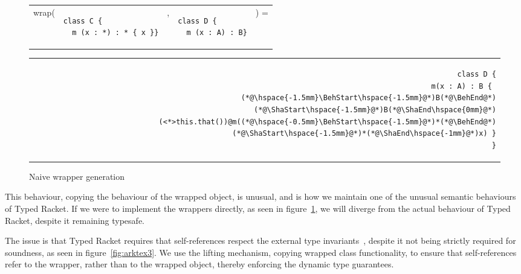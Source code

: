 \documentclass[a4paper,USenglish]{tex/lipics-v2016}
\begin{document}
\begin{figure}[!ht]
\begin{tabular}{ER{4.5cm}ER{3.5cm}E}
wrap( & 
\begin{lstlisting}
class C { 
  m (x : *) : * { x }}
\end{lstlisting}& , &
\begin{lstlisting}
class D { 
  m (x : A) : B}
\end{lstlisting}&) =
\end{tabular}
\begin{tabular}{@{}l@{}r@{}}
\hspace{4cm} \,&
\begin{minipage}{\textwidth-4cm}
\begin{lstlisting}
class D {
  m(x : A) : B { 
    (*@\hspace{-1.5mm}\BehStart\hspace{-1.5mm}@*)B(*@\BehEnd@*)(*@\ShaStart\hspace{-1.5mm}@*)B(*@\ShaEnd\hspace{0mm}@*)(<*>this.that())@m((*@\hspace{-0.5mm}\BehStart\hspace{-1.5mm}@*)*(*@\BehEnd@*)(*@\ShaStart\hspace{-1.5mm}@*)*(*@\ShaEnd\hspace{-1mm}@*)x) }
}
\end{lstlisting}
\end{minipage}
\end{tabular}
\caption{Naive wrapper generation}
\label{fig:rktex2}
\end{figure}

This behaviour, copying the behaviour of the wrapped object, is unusual, and is
how we maintain one of the unusual semantic behaviours of Typed Racket. If we 
were to implement the wrappers directly, as seen in figure~\ref{fig:rktex2}, 
we will diverge from the actual behaviour of Typed Racket, despite it remaining
typesafe.

The issue is that Typed Racket requires that self-references respect the external
type invariants~\cite{Takikawa:2012}, despite it not being strictly required for
soundness, as seen in figure~\ref{fig:arktex3}. We use the lifting mechanism,
copying wrapped class functionality, to ensure that self-references refer to the
wrapper, rather than to the wrapped object, thereby enforcing the dynamic type
guarantees.
\end{document}

